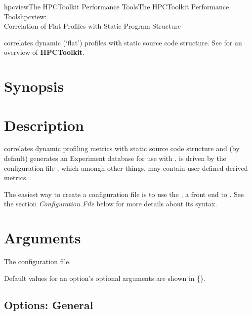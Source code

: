 \documentclass[english]{article}
\begin{document}
\begin{Name}{1}{hpcview}{The HPCToolkit Performance Tools}{The HPCToolkit Performance Tools}{hpcview:\\ Correlation of Flat Profiles with Static Program Structure}

 correlates dynamic (`flat') profiles with static source code structure.  See  for an overview of \textbf{HPCToolkit}.

\end{Name}

\section{Synopsis}

  

\section{Description}

 correlates dynamic profiling metrics with static source code structure and (by default) generates an Experiment database for use with .
 is driven by the configuration file , which amongh other things, may contain user defined derived metrics.

The easiest way to create a configuration file is to use the , a front end to .
See the section \emph{Configuration File} below for more details about its syntax.

\section{Arguments}

\begin{Description}
\item[\Arg{config-file...}] The  configuration file.
\end{Description}

Default values for an option's optional arguments are shown in \{\}.

\subsection{Options: General}
\end{document}
